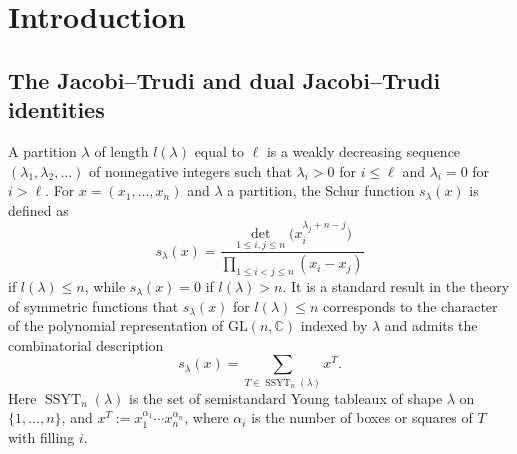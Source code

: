 \documentclass[pdftex]{sigma}
\numberwithin{equation}{section}
\renewcommand{\leq}{\leqslant}
\DeclareMathOperator{\SSYT}{SSYT}
\newcommand{\la}{\lambda}
\begin{document}
\renewcommand{\thefootnote}{\arabic{footnote}}
\setcounter{footnote}{0}

\section{Introduction}


\subsection{The Jacobi--Trudi and dual Jacobi--Trudi identities}

A partition $\la$ of length $l(\la)$ equal to $\ell$ is a weakly
decreasing sequence $(\la_1,\la_2,\dots)$ of nonnegative integers such
that $\la_i>0$ for $i\leq\ell$ and $\la_i=0$ for $i>\ell$.
For $x=(x_1,\dots,x_n)$ and $\la$ a partition, the Schur function
$s_{\la}(x)$ is defined as
\begin{equation*}%
s_{\la}(x)=\frac{\det_{1\leq i,j\leq n}\bigl(x_i^{\la_j+n-j}\bigr)}
{\prod_{1\leq i<j\leq n}(x_i-x_j)}
\end{equation*}
if $l(\la)\leq n$, while $s_{\la}(x)=0$ if $l(\la)>n$.
It is a standard result in the theory of symmetric functions
that $s_{\la}(x)$ for $l(\la)\leq n$
corresponds to the character of the polynomial representation of
$\mathrm{GL}(n,\mathbb{C})$ indexed by $\la$ and admits the
combinatorial description
\begin{equation}\label{Eq_sT}
s_{\la}(x)=\sum_{T\in\SSYT_n(\la)} x^T.
\end{equation}
Here $\SSYT_n(\la)$ is the set of semistandard Young tableaux
of shape $\la$ on $\{1,\dots,n\}$, and
${x^T:=x_1^{\alpha_1}\cdots x_n^{\alpha_n}}$, where
$\alpha_i$ is the number of boxes or squares of $T$ with filling $i$.
\end{document}
